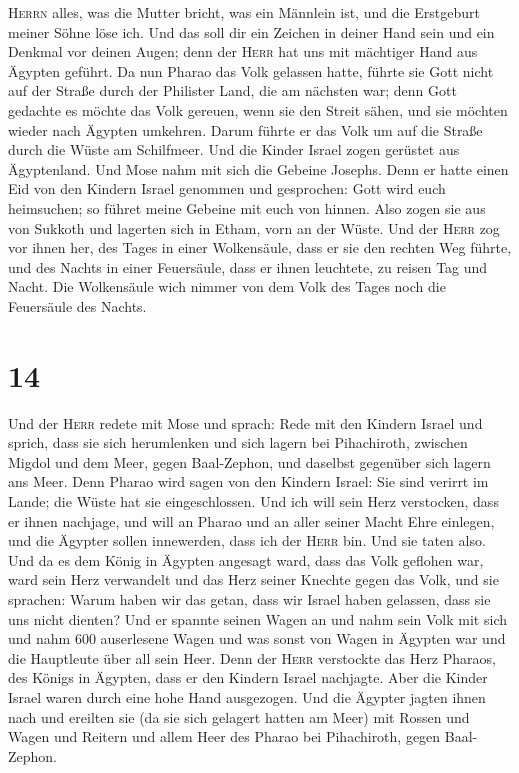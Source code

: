 \textsc{Herrn} alles, was die Mutter bricht, was ein Männlein ist, und
die Erstgeburt meiner Söhne löse ich.  Und das soll dir
ein Zeichen in deiner Hand sein und ein Denkmal vor deinen Augen; denn
der \textsc{Herr} hat uns mit mächtiger Hand aus Ägypten geführt.
 Da nun Pharao das Volk gelassen hatte, führte sie Gott
nicht auf der Straße durch der Philister Land, die am nächsten war; denn
Gott gedachte es möchte das Volk gereuen, wenn sie den Streit sähen, und
sie möchten wieder nach Ägypten umkehren.  Darum führte
er das Volk um auf die Straße durch die Wüste am Schilfmeer. Und die
Kinder Israel zogen gerüstet aus Ägyptenland.  Und Mose
nahm mit sich die Gebeine Josephs. Denn er hatte einen Eid von den
Kindern Israel genommen und gesprochen: Gott wird euch heimsuchen; so
führet meine Gebeine mit euch von hinnen.  Also zogen sie
aus von Sukkoth und lagerten sich in Etham, vorn an der Wüste.
 Und der \textsc{Herr} zog vor ihnen her, des Tages in
einer Wolkensäule, dass er sie den rechten Weg führte, und des Nachts in
einer Feuersäule, dass er ihnen leuchtete, zu reisen Tag und Nacht.
 Die Wolkensäule wich nimmer von dem Volk des Tages noch
die Feuersäule des Nachts.

\hypertarget{section-13}{%
\section{14}\label{section-13}}

 Und der \textsc{Herr} redete mit Mose und sprach:
 Rede mit den Kindern Israel und sprich, dass sie sich
herumlenken und sich lagern bei Pihachiroth, zwischen Migdol und dem
Meer, gegen Baal-Zephon, und daselbst gegenüber sich lagern ans Meer.
 Denn Pharao wird sagen von den Kindern Israel: Sie sind
verirrt im Lande; die Wüste hat sie eingeschlossen.  Und
ich will sein Herz verstocken, dass er ihnen nachjage, und will an
Pharao und an aller seiner Macht Ehre einlegen, und die Ägypter sollen
innewerden, dass ich der \textsc{Herr} bin. Und sie taten also.
 Und da es dem König in Ägypten angesagt ward, dass das
Volk geflohen war, ward sein Herz verwandelt und das Herz seiner Knechte
gegen das Volk, und sie sprachen: Warum haben wir das getan, dass wir
Israel haben gelassen, dass sie uns nicht dienten?  Und er
spannte seinen Wagen an und nahm sein Volk mit sich  und
nahm 600 auserlesene Wagen und was sonst von Wagen in Ägypten war und
die Hauptleute über all sein Heer.  Denn der \textsc{Herr}
verstockte das Herz Pharaos, des Königs in Ägypten, dass er den Kindern
Israel nachjagte. Aber die Kinder Israel waren durch eine hohe Hand
ausgezogen.  Und die Ägypter jagten ihnen nach und
ereilten sie (da sie sich gelagert hatten am Meer) mit Rossen und Wagen
und Reitern und allem Heer des Pharao bei Pihachiroth, gegen
Baal-Zephon.

